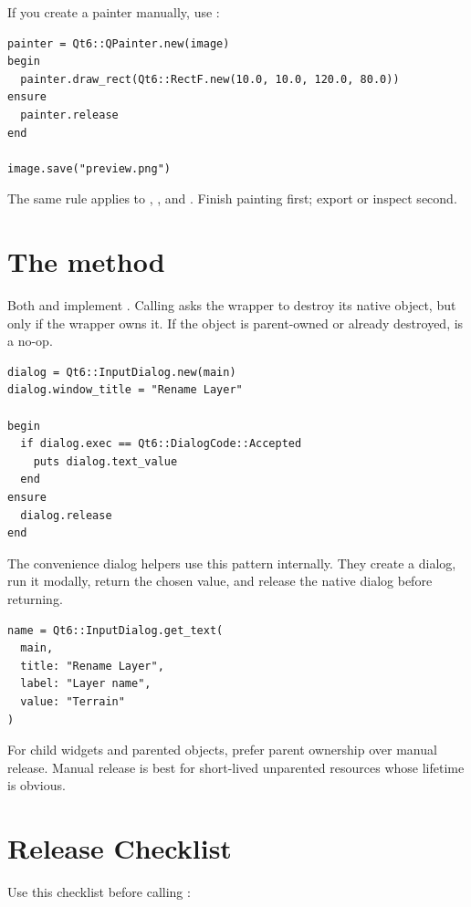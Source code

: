 If you create a painter manually, use :

\begin{lstlisting}[style=crystal]
painter = Qt6::QPainter.new(image)
begin
  painter.draw_rect(Qt6::RectF.new(10.0, 10.0, 120.0, 80.0))
ensure
  painter.release
end

image.save("preview.png")
\end{lstlisting}

The same rule applies to , , and . Finish painting first; export or inspect second.

\section{The  method}

Both  and  implement . Calling  asks the wrapper to destroy its native object, but only if the wrapper owns it. If the object is parent-owned or already destroyed,  is a no-op.

\begin{lstlisting}[style=crystal]
dialog = Qt6::InputDialog.new(main)
dialog.window_title = "Rename Layer"

begin
  if dialog.exec == Qt6::DialogCode::Accepted
    puts dialog.text_value
  end
ensure
  dialog.release
end
\end{lstlisting}

The convenience dialog helpers use this pattern internally. They create a dialog, run it modally, return the chosen value, and release the native dialog before returning.

\begin{lstlisting}[style=crystal]
name = Qt6::InputDialog.get_text(
  main,
  title: "Rename Layer",
  label: "Layer name",
  value: "Terrain"
)
\end{lstlisting}

For child widgets and parented objects, prefer parent ownership over manual release. Manual release is best for short-lived unparented resources whose lifetime is obvious.

\section{Release Checklist}

Use this checklist before calling :

